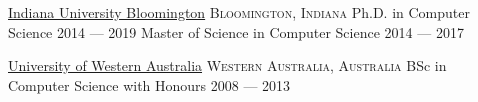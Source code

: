 \documentclass[10pt,a4paper]{article}
\begin{document}

%


\headedsection
  {\href{http://www.indiana.edu}{Indiana University Bloomington}}
  {\textsc{Bloomington, Indiana}} {%
  \headedsubsection
    {Ph.D. in Computer Science 
    }
    {2014 --- 
    2019 %
    }
    {}
  \headedsubsection
    {Master of Science in Computer Science}
    {2014 ---
    2017}
    {}
}

\headedsection
  {\href{http://www.uwa.edu.au}{University of Western Australia}}
  {\textsc{Western Australia, Australia}} {%
  \headedsubsection
    {BSc in Computer Science with Honours}
    {2008 ---
    2013}
    {}
}

%
%
%

%
%
\end{document}
